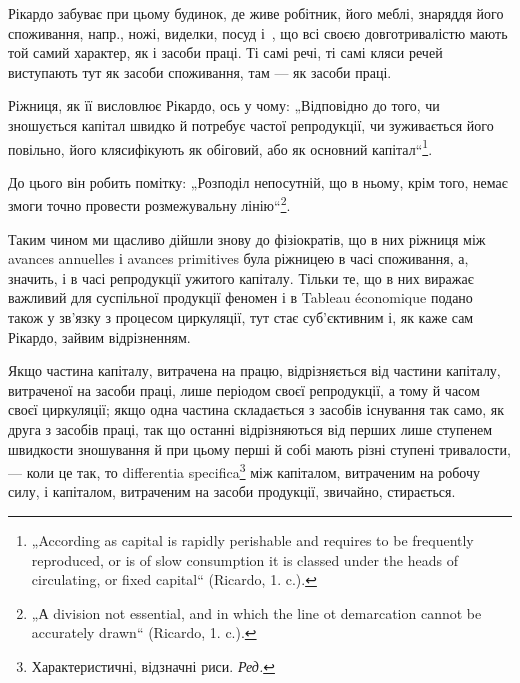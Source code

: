 
Рікардо забуває при цьому будинок, де живе робітник, його меблі,
знаряддя його споживання, напр., ножі, виделки, посуд і~, що всі
своєю довготривалістю мають той самий характер, як і засоби праці. Ті
самі речі, ті самі кляси речей виступають тут як засоби споживання,
там — як засоби праці.

Ріжниця, як її висловлює Рікардо, ось у чому: „Відповідно до того,
чи зношується капітал швидко й потребує частої репродукції, чи зуживається
його повільно, його клясифікують як обіговий, або як основний
капітал“\footnote{
„According as capital is rapidly perishable and requires to be frequently
reproduced, or is of slow consumption it is classed under the heads of circulating,
or fixed capital“ (Ricardo, 1. c.).
}.

До цього він робить помітку: „Розподіл непосутній, що в ньому, крім
того, немає змоги точно провести розмежувальну лінію“\footnote{
„А division not essential, and in which the line ot demarcation cannot be
accurately drawn“ (Ricardo, 1. c.).
}.

Таким чином ми щасливо дійшли знову до фізіократів, що в них
ріжниця між avances annuelles і avances primitives була ріжницею в часі
споживання, а, значить, і в часі репродукції ужитого капіталу. Тільки те,
що в них виражає важливий для суспільної продукції феномен і в Tableau
économique подано також у зв’язку з процесом циркуляції, тут стає
суб’єктивним і, як каже сам Рікардо, зайвим відрізненням.

Якщо частина капіталу, витрачена на працю, відрізняється від частини
капіталу, витраченої на засоби праці, лише періодом своєї репродукції,
а тому й часом своєї циркуляції; якщо одна частина складається з засобів
існування так само, як друга з засобів праці, так що останні відрізняються
від перших лише ступенем швидкости зношування й при цьому
перші й собі мають різні ступені тривалости, — коли це так, то differentia
specifica\footnote*{
Характеристичні, відзначні риси. \emph{Ред.}
} між капіталом, витраченим на робочу силу, і капіталом, витраченим
на засоби продукції, звичайно, стирається.

